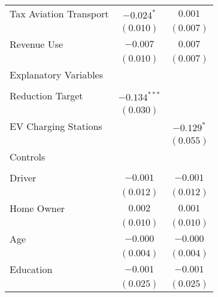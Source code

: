 \begin{center}
\begin{tiny}
\begin{longtable}{l@{} c@{} c@{}}
\quad Tax Aviation Transport                           & $-0.024^{*}$    & $0.001$        \\
                                                       & $(0.010)$       & $(0.007)$      \\
\quad Revenue Use                                      & $-0.007$        & $0.007$        \\
                                                       & $(0.010)$       & $(0.007)$      \\
Explanatory Variables                                  &                 &                \\
                                                       &                 &                \\
\quad Reduction Target                                 & $-0.134^{***}$  &                \\
                                                       & $(0.030)$       &                \\
\quad EV Charging Stations                             &                 & $-0.129^{*}$   \\
                                                       &                 & $(0.055)$      \\
Controls                                               &                 &                \\
                                                       &                 &                \\
\quad Driver                                           & $-0.001$        & $-0.001$       \\
                                                       & $(0.012)$       & $(0.012)$      \\
\quad Home Owner                                       & $0.002$         & $0.001$        \\
                                                       & $(0.010)$       & $(0.010)$      \\
\quad Age                                              & $-0.000$        & $-0.000$       \\
                                                       & $(0.004)$       & $(0.004)$      \\
\quad Education                                        & $-0.001$        & $-0.001$       \\
                                                       & $(0.025)$       & $(0.025)$      \\

\end{longtable}
\end{tiny}
\end{center}
